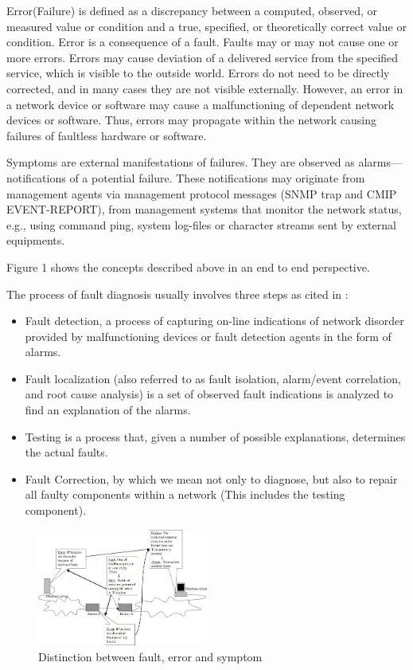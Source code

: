 \documentclass[10pt]{sigplan-proc-varsize}
\begin{document}
Error(Failure) is defined as a discrepancy between a computed, observed, or measured value or condition and a true, specified, or theoretically correct value or condition. 
Error is a consequence of a fault. Faults may or may not cause one or more errors. 
Errors may cause deviation of a delivered service from the specified service, which is visible to the outside world. 
Errors do not need to be directly corrected, and in many cases they are not visible externally. 
However, an error in a network device or software may cause a malfunctioning of dependent network devices or software. 
Thus, errors may propagate within the network causing failures of faultless hardware or software.

Symptoms are external manifestations of failures. They are observed as alarms—notifications of a potential failure. 
These notifications may originate from management agents via management protocol messages (SNMP trap and CMIP EVENT-REPORT), 
from management systems that monitor the network status, e.g., using command ping, system log-files or character streams sent by external equipments.

Figure 1 shows the concepts described above in an end to end perspective.

The process of fault diagnosis usually involves three steps as cited in \cite{KatzelaThesis:1996}:

\begin{itemize}
  \item Fault detection, a process of capturing on-line indications of network disorder provided by malfunctioning devices or fault detection agents in the 
  form of alarms.
  \item Fault localization (also referred to as fault isolation, alarm/event correlation, and root cause analysis) is a set of observed fault indications is analyzed to 
  find an explanation of the alarms.
  \item Testing is a process that, given a number of possible explanations, determines the actual faults.
  \item Fault Correction, by which we mean not only to diagnose, but
also to repair all faulty components within a network (This includes the testing component).
\end{itemize}

\begin{figure}[h!]
  \caption{Distinction between fault, error and symptom}
  \centering
    \includegraphics[width=0.5\textwidth]{Fig1}
\end{figure}
\end{document}
